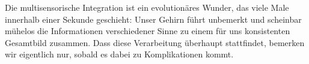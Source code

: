 Die multisensorische Integration ist ein evolution\"ares Wunder, das viele Male innerhalb einer Sekunde geschieht: 
Unser Gehirn f\"uhrt unbemerkt und scheinbar m\"uhelos die Informationen verschiedener Sinne zu einem f\"ur uns konsistenten Gesamtbild zusammen. 
Dass diese Verarbeitung \"uberhaupt stattfindet, bemerken wir eigentlich nur, sobald es dabei zu Komplikationen kommt.

